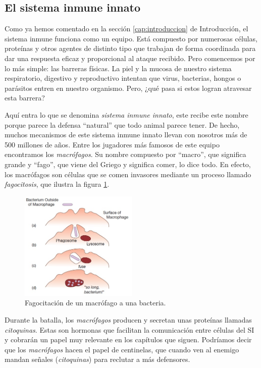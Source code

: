 \subsection{El sistema inmune innato}
Como ya hemos comentado en la sección \ref{cap:introduccion} de Introducción, el sistema inmune funciona como un equipo. Está compuesto por numerosas células, proteínas y otros agentes de distinto tipo que trabajan de forma coordinada para dar una respuesta eficaz y proporcional al ataque recibido. Pero comencemos por lo más simple: las barreras físicas. La piel y la mucosa de nuestro sistema respiratorio, digestivo y reproductivo intentan que virus, bacterias, hongos o parásitos entren en nuestro organismo. Pero, ¿qué pasa si estos logran atravesar esta barrera?

Aquí entra lo que se denomina \textit{sistema inmune innato}, este recibe este nombre porque parece la defensa ``natural'' que todo animal parece tener. De hecho, muchos mecanismos de este sistema inmune innato llevan con nosotros más de 500 millones de años. 
Entre los jugadores más famosos de este equipo encontramos los \textit{macrófagos}. Su nombre compuesto por ``macro'', que significa grande y ``fago'', que viene del Griego y significa comer, lo dice todo. En efecto, los macrófagos son células que se comen invasores mediante un proceso llamado \textit{fagocitosis}, que ilustra la figura \ref{fig:macrofago}.


\begin{figure}[t]
	\centering
	\includegraphics[width=0.5\textwidth]{1_macrofago}
	\caption{Fagocitación de un macrófago a una bacteria.}
	\label{fig:macrofago}
\end{figure}


Durante la batalla, los \textit{macrófagos} producen y secretan unas proteínas llamadas \textit{citoquinas}.
Estas son hormonas que facilitan la comunicación entre células del SI y cobrarán un papel muy relevante en los capítulos que siguen.
Podríamos decir que los \textit{macrófagos} hacen el papel de centinelas, que cuando ven al enemigo mandan señales (\textit{citoquinas}) para reclutar a más defensores.

